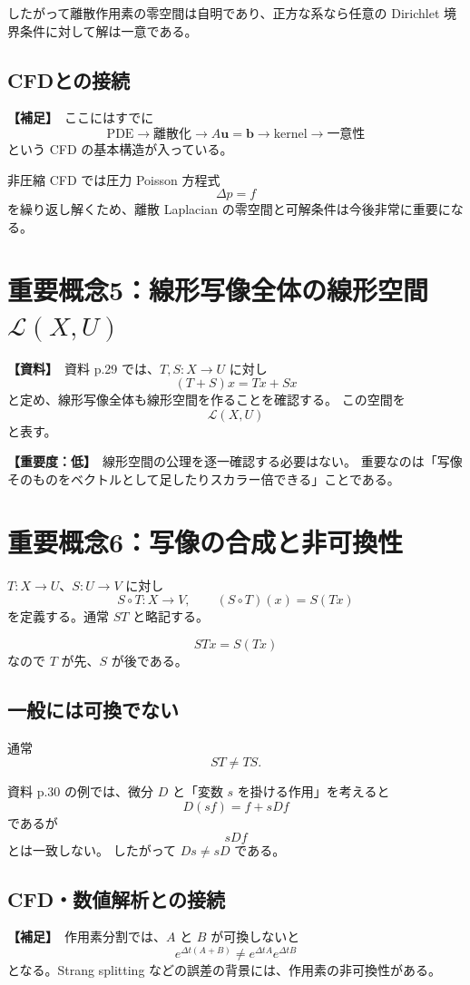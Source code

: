 \documentclass[a4paper,11pt]{ltjsarticle}
\newcommand{\Lcal}{\mathcal{L}}
\newcommand{\sourceitem}{\textbf{【資料】}}
\newcommand{\suppitem}{\textbf{【補足】}}
\newcommand{\lowimportance}{\textbf{【重要度：低】}}
\begin{document}
したがって離散作用素の零空間は自明であり、正方な系なら任意の Dirichlet 境界条件に対して解は一意である。

\subsection{CFDとの接続}
\suppitem\ ここにはすでに
\[
\boxed{
\text{PDE}
\to
\text{離散化}
\to
A\bm u=\bm b
\to
\text{kernel}
\to
\text{一意性}
}
\]
という CFD の基本構造が入っている。

非圧縮 CFD では圧力 Poisson 方程式
\[
\Delta p=f
\]
を繰り返し解くため、離散 Laplacian の零空間と可解条件は今後非常に重要になる。

\section{重要概念5：線形写像全体の線形空間 $\Lcal(X,U)$}

\sourceitem\ 資料 p.29 では、$T,S:X\to U$ に対し
\[
(T+S)x=Tx+Sx
\]
と定め、線形写像全体も線形空間を作ることを確認する。
この空間を
\[
\boxed{\Lcal(X,U)}
\]
と表す。

\lowimportance\ 線形空間の公理を逐一確認する必要はない。
重要なのは「写像そのものをベクトルとして足したりスカラー倍できる」ことである。

\section{重要概念6：写像の合成と非可換性}

$T:X\to U$、$S:U\to V$ に対し
\[
S\circ T:X\to V,
\qquad
(S\circ T)(x)=S(Tx)
\]
を定義する。通常 $ST$ と略記する。

\[
\boxed{STx=S(Tx)}
\]
なので $T$ が先、$S$ が後である。

\subsection{一般には可換でない}
通常
\[
\boxed{ST\ne TS.}
\]

資料 p.30 の例では、微分 $D$ と「変数 $s$ を掛ける作用」を考えると
\[
D(sf)=f+sDf
\]
であるが
\[
sDf
\]
とは一致しない。
したがって $Ds\ne sD$ である。

\subsection{CFD・数値解析との接続}
\suppitem\ 作用素分割では、$A$ と $B$ が可換しないと
\[
e^{\Delta t(A+B)}\ne e^{\Delta t A}e^{\Delta t B}
\]
となる。Strang splitting などの誤差の背景には、作用素の非可換性がある。
\end{document}
